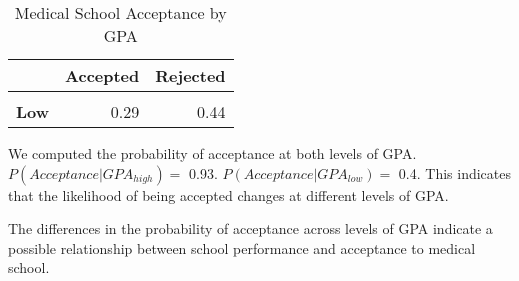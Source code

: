 \documentclass[
]{article}
\begin{document}
\begin{table}[!h]

\caption{\label{tab:unnamed-chunk-16}Medical School Acceptance by GPA}
\centering
\begin{tabular}[t]{>{}lrr}
\toprule
\textbf{ } & \textbf{Accepted} & \textbf{Rejected}\\
\midrule
\textbf{\cellcolor{gray!6}{High}} & \cellcolor{gray!6}{0.25} & \cellcolor{gray!6}{0.02}\\
\textbf{Low} & 0.29 & 0.44\\
\bottomrule
\end{tabular}
\end{table}

We computed the probability of acceptance at both levels of GPA.
\(P(Acceptance|GPA_{high}) =\) 0.93. \(P(Acceptance|GPA_{low}) =\) 0.4.
This indicates that the likelihood of being accepted changes at
different levels of GPA.

The differences in the probability of acceptance across levels of GPA
indicate a possible relationship between school performance and
acceptance to medical school.
\end{document}
